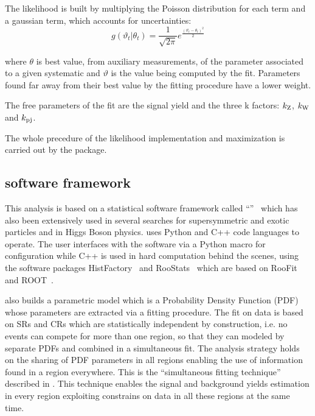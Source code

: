 The likelihood is built by multiplying the Poisson distribution for each term and a gaussian term, which accounts for uncertainties:
\begin{equation}
   g(\vartheta_{t} \vert \theta_{t}) = \frac{1}{\sqrt{2\pi}}e^{\frac{(\vartheta_{t}-\theta_{t})^2}{2} } 
   \label{eqn:gauss}
\end{equation} 

where $\theta$ is best value, from auxiliary measurements, of the parameter associated to a given systematic and $\vartheta$ is the value being computed by the fit. Parameters found far away from their best value by the fitting procedure have a lower weight.

The free parameters of the fit are the signal yield and the three k factors: $k_{\textup{Z}}$, $k_{\textup{W}}$ and $k_{\textup{pj}}$.

The whole precedure of the likelihood implementation and maximization is carried out by the \hf package.

\subsection{\hf software framework}

This analysis is based on a statistical software framework called ``\hf''~\cite{baak:histfitter} which has also been extensively used in several searches for supersymmetric and exotic particles and in Higgs Boson physics. 
\hf uses Python and C++ code languages to operate. The user interfaces with the software via a Python macro for configuration while C++ is used in hard computation behind the scenes, using the software packages HistFactory~\cite{Cranmer:1456844} and RooStats~\cite{2010acat.confE..57M} which are based on RooFit~\cite{2003physics...6116V} and ROOT~\cite{Brun:1997pa}.

\hf also builds a parametric model which is a Probability Density Function (PDF) whose parameters are extracted via a fitting procedure. The fit on data is based on SRs and CRs which are statistically independent by construction, i.e. no events can compete for more than one region, so that they can modeled by separate PDFs and combined in a simultaneous fit. The \hf analysis strategy holds on the sharing of PDF parameters in all regions enabling the use of information found in a region everywhere. This is the ``simultaneous fitting technique'' described in \Sect{\ref{sec:simfit}}. This technique enables the signal and background yields estimation in every region exploiting constrains on data in all these regions at the same time.

